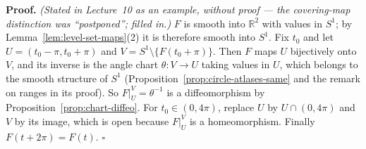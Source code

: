 \documentclass[11pt]{report}
\renewenvironment{proof}[1][Proof]{\noindent\textbf{#1.} }{\hfill$\square$\par\vspace{5pt}}
\begin{document}
\begin{proof}
\textit{(Stated in Lecture~10 as an example, without proof --- the covering-map distinction was ``postponed''; filled in.)} $F$ is smooth into $\mathbb{R}^2$ with values in $S^1$; by Lemma~\ref{lem:level-set-maps}(2) it is therefore smooth into $S^1$. Fix $t_0$ and let $U = (t_0 - \pi, t_0 + \pi)$ and $V = S^1 \setminus \{F(t_0 + \pi)\}$. Then $F$ maps $U$ bijectively onto $V$, and its inverse is the angle chart $\theta : V \to U$ taking values in $U$, which belongs to the smooth structure of $S^1$ (Proposition~\ref{prop:circle-atlases-same} and the remark on ranges in its proof). So $F|_U^V = \theta^{-1}$ is a diffeomorphism by Proposition~\ref{prop:chart-diffeo}. For $t_0 \in (0,4\pi)$, replace $U$ by $U \cap (0, 4\pi)$ and $V$ by its image, which is open because $F|_U^V$ is a homeomorphism. Finally $F(t + 2\pi) = F(t)$.
\end{proof}
\end{document}
